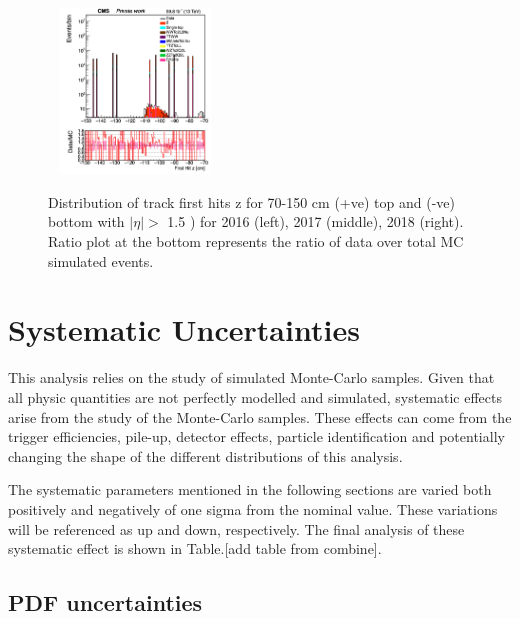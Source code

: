 \documentclass{cernatlasnote}
\begin{document}
\begin{figure}[htp]
 \includegraphics[width=4.6cm, height=4.4cm]{images/emu_channel/2018/18_Plots_for_r_z/track_Track_firstHit_z_TRK_etaGT1p5_zGT70_minus_Log.png}\\
  \caption{Distribution of  track first hits z for 70-150 cm (+ve) top and (-ve) bottom with $|\eta|>$ 1.5 ) for 2016 (left), 2017 (middle), 2018 (right). Ratio plot at the bottom represents the ratio of data over total MC simulated events.}
 \label{fig:L0DATAMC}
  \end{figure}



 
\pagebreak
\newpage
\section{Systematic Uncertainties}
\label{SEC: SYST}
This analysis relies on the study of simulated Monte-Carlo samples. Given that all physic quantities are not perfectly modelled and simulated, systematic effects arise from the study of the Monte-Carlo samples. These effects can come from the trigger efficiencies, pile-up, detector effects, particle identification and potentially changing the shape of the different distributions of this analysis.

The systematic parameters mentioned in the following sections are varied both positively and negatively of one sigma from the nominal value. These variations will be referenced as up and down, respectively. The final analysis of these systematic effect is shown in Table.[add table from combine].

    \subsection{PDF uncertainties}
    
\end{document}
